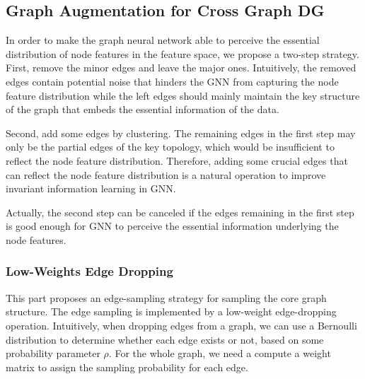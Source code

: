\subsection{Graph Augmentation for Cross Graph DG}
In order to make the graph neural  network able to perceive the essential distribution of node features in the feature space, we propose a two-step strategy. First, remove the minor edges and leave the major ones. Intuitively, the removed edges contain potential noise that hinders the GNN  from capturing the node feature distribution while the left edges should mainly maintain the key structure of the graph that embeds the essential information of the data.

Second, add some edges by clustering. The remaining edges in the first step may  only be the partial edges of the key topology, which would be insufficient to reflect the node feature distribution.  Therefore, adding some crucial edges that can reflect the node feature distribution is a natural operation to improve invariant information learning in GNN.

Actually, the second step can be canceled if the edges remaining in the first step is good enough for GNN to perceive the essential information underlying the node features. 


\subsubsection{Low-Weights Edge Dropping} \label{subsec:low-weights}
This part proposes an edge-sampling strategy for sampling the core graph structure. The edge sampling is implemented by a low-weight edge-dropping operation. Intuitively, when dropping edges from a graph, we can use a Bernoulli distribution to determine whether each edge exists or not, based on some probability parameter $\rho$. For the whole graph, we need a compute a weight matrix to assign the sampling probability for each edge. 



